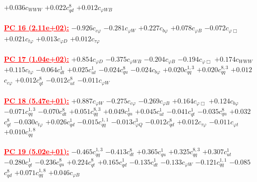 \documentclass{article}
\begin{document}
{$+0.036$}{\rm $c_{WWW}$}
{$+0.022$}{\rm $c_{qd}^{8}$}
{$+0.012$}{\rm $c_{\varphi WB}$}
 \nonumber \\ \nonumber \\
\noindent \textcolor{red}{\underline{\bf{PC 16} (2.11e+02):}}
{$-0.926$}{\rm $c_{c \varphi}$}
{$-0.281$}{\rm $c_{\varphi W}$}
{$+0.227$}{\rm $c_{b \varphi}$}
{$+0.078$}{\rm $c_{\varphi B}$}
{$-0.072$}{\rm $c_{\varphi \Box}$}
{$+0.021$}{\rm $c_{t \varphi}$}
{$+0.013$}{\rm $c_{\varphi D}$}
{$+0.012$}{\rm $c_{\tau \varphi}$}
 \nonumber \\ \nonumber \\
\noindent \textcolor{red}{\underline{\bf{PC 17} (1.04e+02):}}
{$+0.854$}{\rm $c_{\varphi D}$}
{$-0.375$}{\rm $c_{\varphi WB}$}
{$-0.204$}{\rm $c_{\varphi B}$}
{$-0.194$}{\rm $c_{\varphi \Box}$}
{$+0.174$}{\rm $c_{WWW}$}
{$+0.115$}{\rm $c_{t \varphi}$}
{$-0.064$}{\rm $c_{dt}^{1}$}
{$+0.025$}{\rm $c_{ut}^{1}$}
{$-0.024$}{\rm $c_{qu}^{8}$}
{$-0.024$}{\rm $c_{b \varphi}$}
{$+0.020$}{\rm $c_{qq}^{1,3}$}
{$+0.020$}{\rm $c_{qq}^{8,3}$}
{$+0.012$}{\rm $c_{c \varphi}$}
{$+0.012$}{\rm $c_{qt}^{8}$}
{$-0.012$}{\rm $c_{ut}^{8}$}
{$-0.011$}{\rm $c_{\varphi W}$}
 \nonumber \\ \nonumber \\
\noindent \textcolor{red}{\underline{\bf{PC 18} (5.47e+01):}}
{$+0.887$}{\rm $c_{\varphi W}$}
{$-0.275$}{\rm $c_{c \varphi}$}
{$-0.269$}{\rm $c_{\varphi B}$}
{$+0.164$}{\rm $c_{\varphi \Box}$}
{$+0.124$}{\rm $c_{b \varphi}$}
{$-0.071$}{\rm $c_{qq}^{1,3}$}
{$-0.070$}{\rm $c_{dt}^{8}$}
{$+0.051$}{\rm $c_{qq}^{8,3}$}
{$+0.049$}{\rm $c_{qu}^{1}$}
{$+0.045$}{\rm $c_{ut}^{1}$}
{$-0.041$}{\rm $c_{qt}^{1}$}
{$-0.035$}{\rm $c_{qu}^{8}$}
{$+0.032$}{\rm $c_{qt}^{8}$}
{$-0.030$}{\rm $c_{t \varphi}$}
{$+0.026$}{\rm $c_{qd}^{1}$}
{$-0.015$}{\rm $c_{qq}^{1,1}$}
{$-0.013$}{\rm $c_{\varphi Q}^{3}$}
{$-0.012$}{\rm $c_{qd}^{8}$}
{$+0.012$}{\rm $c_{\tau \varphi}$}
{$-0.011$}{\rm $c_{\varphi t}$}
{$+0.010$}{\rm $c_{qq}^{1,8}$}
 \nonumber \\ \nonumber \\
\noindent \textcolor{red}{\underline{\bf{PC 19} (5.02e+01):}}
{$-0.465$}{\rm $c_{qq}^{1,3}$}
{$-0.413$}{\rm $c_{dt}^{8}$}
{$+0.365$}{\rm $c_{qu}^{1}$}
{$+0.325$}{\rm $c_{qq}^{8,3}$}
{$+0.307$}{\rm $c_{ut}^{1}$}
{$-0.280$}{\rm $c_{qt}^{1}$}
{$-0.236$}{\rm $c_{qu}^{8}$}
{$+0.224$}{\rm $c_{qt}^{8}$}
{$+0.165$}{\rm $c_{qd}^{1}$}
{$-0.135$}{\rm $c_{dt}^{1}$}
{$-0.133$}{\rm $c_{\varphi W}$}
{$-0.121$}{\rm $c_{qq}^{1,1}$}
{$-0.085$}{\rm $c_{qd}^{8}$}
{$+0.071$}{\rm $c_{qq}^{1,8}$}
{$+0.046$}{\rm $c_{\varphi B}$}
\end{document}
